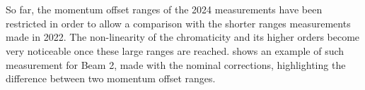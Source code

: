 \section{}

\subsection{}

\subsubsection{}

So far, the momentum offset ranges of the 2024 measurements have been restricted in order to allow a 
comparison with the shorter ranges measurements made in 2022. The non-linearity of the chromaticity 
and its higher orders become very noticeable once these large ranges are reached.
 shows an example of such measurement for 
Beam 2, made with the nominal corrections, highlighting the difference between two momentum offset
ranges.

